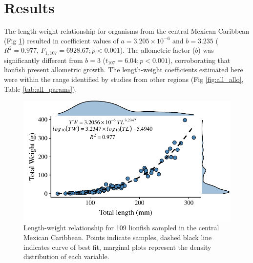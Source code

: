 \documentclass[fleqn,10pt,lineno]{wlpeerj} %
\begin{document}
\clearpage

\section*{Results}

The length-weight relationship for organisms from the central Mexican
Caribbean (Fig \ref{fig:l-w-carib}) resulted in coefficient values of
\(a = 3.205 \times 10^{-6}\) and \(b = 3.235\) (\(R^2 = 0.977\),
\(F_{1, 107} = 6928.67; p < 0.001\)). The allometric factor (\(b\)) was
significantly different from \(b = 3\) (\(t_{107} = 6.04; p<0.001\)),
corroborating that lionfish present allometric growth. The length-weight
coefficients estimated here were within the range identified by studies
from other regions (Fig \ref{fig:all_allo}, Table \ref{tab:all_params}).

\begin{figure}
\centering
\includegraphics{Manuscript_files/figure-latex/fit1-1.pdf}
\caption{\label{fig:l-w-carib}Length-weight relationship for 109
lionfish sampled in the central Mexican Caribbean. Points indicate
samples, dashed black line indicates curve of best fit, marginal plots
represent the density distribution of each variable.}
\end{figure}
\end{document}

